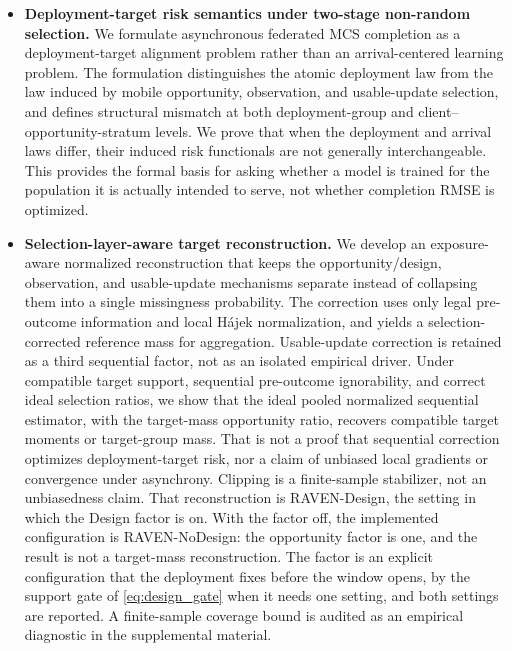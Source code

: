 \documentclass[letterpaper,journal]{IEEEtran}
\begin{document}
\begin{itemize}
    \item \textbf{Deployment-target risk semantics under two-stage non-random
    selection.}
    We formulate asynchronous federated MCS completion as a
    deployment-target alignment problem rather than an arrival-centered
    learning problem.  The formulation distinguishes the atomic deployment law
    from the law induced by mobile opportunity, observation, and usable-update
    selection, and defines structural mismatch at both deployment-group and
    client--opportunity-stratum levels.  We prove that when the deployment and
    arrival laws differ, their induced risk functionals are not generally
    interchangeable.  This provides the formal basis for asking whether a model
    is trained for the population it is actually intended to serve, not whether
    completion RMSE is optimized.

    \item \textbf{Selection-layer-aware target reconstruction.}
    We develop an exposure-aware normalized reconstruction that keeps the
    opportunity/design, observation, and usable-update mechanisms separate
    instead of collapsing them into a single missingness probability.  The
    correction uses only legal pre-outcome information and local
    H\'ajek normalization, and yields a selection-corrected reference mass
    for aggregation.  Usable-update correction is retained as a third
    sequential factor, not as an isolated empirical driver.
    Under compatible target support, sequential pre-outcome ignorability,
    and correct ideal selection ratios, we show that the ideal pooled
    normalized sequential estimator,
    with the target-mass opportunity ratio, recovers compatible target moments
    or target-group mass.  That is not a
    proof that sequential correction optimizes deployment-target risk, nor a
    claim of unbiased local gradients or convergence under asynchrony.
    Clipping is a finite-sample
    stabilizer, not an unbiasedness claim.  That reconstruction is
    RAVEN-Design, the setting in which the Design factor is on.  With the
    factor off, the implemented configuration is RAVEN-NoDesign: the
    opportunity factor is one, and the result is not a target-mass
    reconstruction.  The factor is an explicit configuration that the deployment
    fixes before the window opens, by the support gate of \eqref{eq:design_gate}
    when it needs one setting, and both settings are reported.  A finite-sample
    coverage bound is audited as an empirical diagnostic in the
    supplemental material.


\end{itemize}
\end{document}
